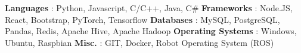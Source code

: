 \begin{cventries}  
\skillentry
    {
    \space \textbf{Languages} : Python, Javascript, C/C++, Java, C\#
    \space \textbf{Frameworks} : Node.JS, React, Bootstrap, PyTorch,  Tensorflow
    \space \textbf{Databases} : MySQL, PostgreSQL, Pandas, Redis, Apache Hive, Apache Hadoop
    \space \textbf{Operating Systems} : Windows, Ubuntu, Raspbian
    \space \textbf{Misc.} : GIT, Docker, Robot Operating System (ROS)
    }
    

\end{cventries}
\vspace{0.5 cm}